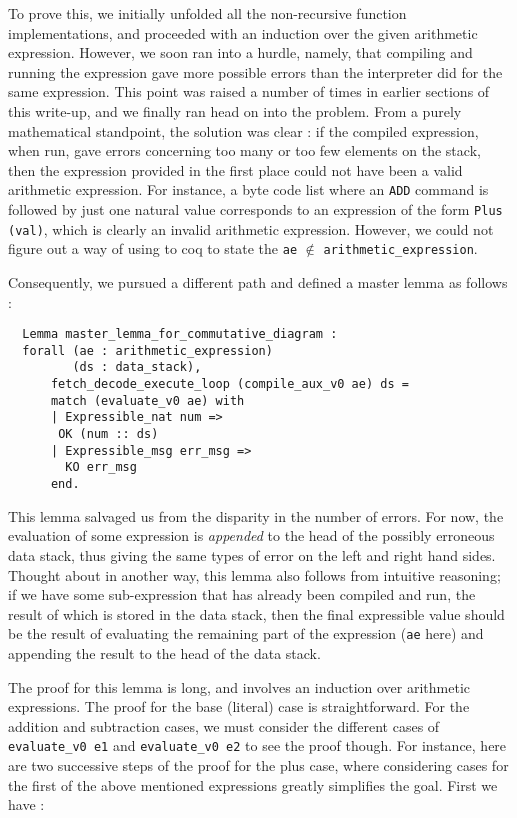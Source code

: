 \documentclass[12pt, a4paper]{article}
\begin{document}
To prove this, we initially unfolded all the non-recursive function implementations, 
and proceeded with an induction over the given arithmetic expression. However, we soon
ran into a hurdle, namely, that compiling and running the expression gave more 
possible errors than the interpreter did for the same expression. This point was 
raised a number of times in earlier sections of this write-up, and we finally ran
head on into the problem. From a purely mathematical standpoint, the solution was 
clear : if the compiled expression, when run, gave errors concerning too many or 
too few elements on the stack, then the expression provided in the first place
could not have been a valid arithmetic expression. For instance, a byte code list
where an \verb-ADD- command is followed by just one natural value corresponds 
to an expression of the form \verb-Plus (val)-, which is clearly an invalid
arithmetic expression. However, we could not figure out a way of using to coq to
state the \verb-ae- $\notin$ \verb-arithmetic_expression-. 

Consequently, we pursued a different path and defined a master lemma as follows :

\begin{lstlisting}
  Lemma master_lemma_for_commutative_diagram :
  forall (ae : arithmetic_expression)
         (ds : data_stack),
      fetch_decode_execute_loop (compile_aux_v0 ae) ds =     
      match (evaluate_v0 ae) with
      | Expressible_nat num =>
       OK (num :: ds)
      | Expressible_msg err_msg =>
        KO err_msg
      end.  
\end{lstlisting}

This lemma salvaged us from the disparity in the number of errors. For now, the
evaluation of some expression is \textit{appended} to the head of the possibly
erroneous data stack, thus giving the same types of error on the left and right
hand sides. Thought about in another way, this lemma also follows from intuitive 
reasoning; if we have some sub-expression that has already been compiled and run, the result of 
which is stored in the data stack, then the final expressible value should be
the result of evaluating the remaining part of the expression (\verb-ae- here) and
appending the result to the head of the data stack. 

The proof for this lemma is long, and involves an induction over arithmetic 
expressions. The proof for the base (literal) case is straightforward. For the addition
and subtraction cases, we must consider the different cases of 
\verb-evaluate_v0 e1- and \verb-evaluate_v0 e2- to see the proof though. For
instance, here are two successive steps of the proof for the plus case, where
considering cases for the first of the above mentioned expressions greatly
simplifies the goal. First we have : 
\end{document}
